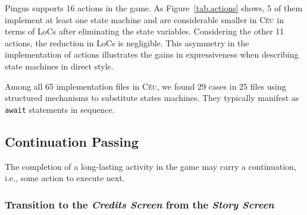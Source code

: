 \documentclass{vgtc}                          %
\newcommand{\CEU}{\textsc{C\'{e}u}\xspace}
\newcommand{\code}[1] {{\small{\texttt{#1}}}}
\begin{document}
Pingus supports 16 actions in the game.
As Figure~\ref{tab.actions} shows, 5 of them implement at least one state
machine and are considerable smaller in \CEU in terms of LoCs after eliminating
the state variables.
%
Considering the other 11 actions, the reduction in LoCs is negligible.
This asymmetry in the implementation of actions illustrates the gains in
expressiveness when describing state machines in direct style.


Among all 65 implementation files in \CEU, we found 29 cases in 25 files using
structured mechanisms to substitute states machines.
They typically manifest as \code{await} statements in sequence.

\subsection{Continuation Passing}
\label{sec.pats.cps}

    The completion of a long-lasting activity in the game may carry a
    continuation, i.e., some action to execute next.

\subsubsection{ Transition to the \emph{Credits Screen} from the \emph{Story Screen} }
\end{document}
